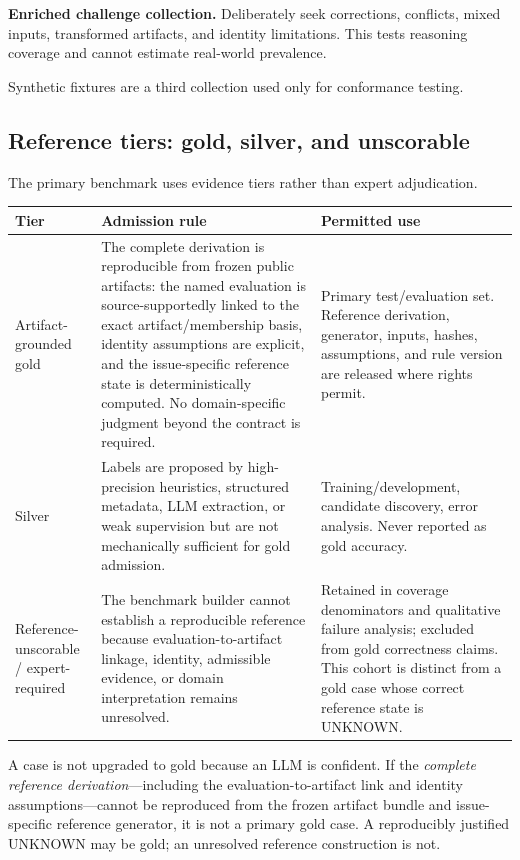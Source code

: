 \documentclass[11pt,a4paper]{article}
\newcommand{\status}[1]{\textsf{\small #1}}
\begin{document}
\textbf{Enriched challenge collection.} Deliberately seek corrections, conflicts, mixed inputs, transformed artifacts, and identity limitations. This tests reasoning coverage and cannot estimate real-world prevalence.

Synthetic fixtures are a third collection used only for conformance testing.

\subsection{Reference tiers: gold, silver, and unscorable}
The primary benchmark uses evidence tiers rather than expert adjudication.

\begin{tabularx}{\linewidth}{@{}L{28mm}Y Y@{}}
\toprule
\textbf{Tier} & \textbf{Admission rule} & \textbf{Permitted use}\\ \midrule
Artifact-grounded gold & The complete derivation is reproducible from frozen public artifacts: the named evaluation is source-supportedly linked to the exact artifact/membership basis, identity assumptions are explicit, and the issue-specific reference state is deterministically computed. No domain-specific judgment beyond the contract is required. & Primary test/evaluation set. Reference derivation, generator, inputs, hashes, assumptions, and rule version are released where rights permit.\\
Silver & Labels are proposed by high-precision heuristics, structured metadata, LLM extraction, or weak supervision but are not mechanically sufficient for gold admission. & Training/development, candidate discovery, error analysis. Never reported as gold accuracy.\\
Reference-unscorable / expert-required & The benchmark builder cannot establish a reproducible reference because evaluation-to-artifact linkage, identity, admissible evidence, or domain interpretation remains unresolved. & Retained in coverage denominators and qualitative failure analysis; excluded from gold correctness claims. This cohort is distinct from a gold case whose correct reference state is \status{UNKNOWN}.\\
\bottomrule
\end{tabularx}

A case is not upgraded to gold because an LLM is confident. If the \emph{complete reference derivation}---including the evaluation-to-artifact link and identity assumptions---cannot be reproduced from the frozen artifact bundle and issue-specific reference generator, it is not a primary gold case. A reproducibly justified \status{UNKNOWN} may be gold; an unresolved reference construction is not.
\end{document}
